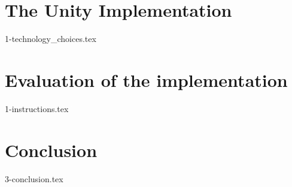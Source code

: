 \documentclass[UKenglish]{ifimaster}
\begin{document}
\chapter{The Unity Implementation}
{1-technology_choices.tex}

\chapter{Evaluation of the implementation}
{1-instructions.tex}

\chapter{Conclusion}
{3-conclusion.tex}

\backmatter{}


\end{document}

